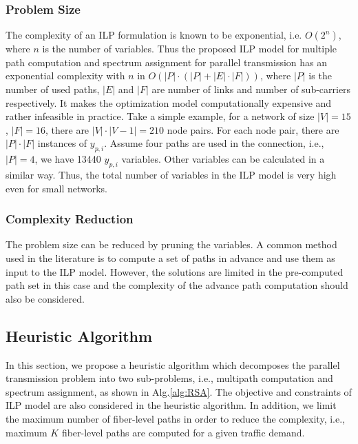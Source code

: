 \documentclass[conference]{IEEEtran}
\begin{document}
\subsubsection{Problem Size}
The complexity of an ILP formulation is known to be exponential, i.e. $O(2^n)$, where $n$ is the number of variables. Thus the
proposed ILP model for  multiple path computation and spectrum assignment for parallel transmission  has an exponential complexity with $n$ in $O(|P|\cdot(|P|+|E|\cdot|F|))$, where $|P|$ is the number of used paths, $|E|$ and $|F|$ are number of links and number of sub-carriers respectively. It 
makes the optimization model computationally  expensive and rather infeasible in practice.  
Take a simple 
example, for a network of size $|V|=15$, $|F|=16$, there are $|V|\cdot |V-1|= 210$ node pairs. For each node pair, there are $|P|\cdot |F|$ instances of $y_{p,i}$.  
Assume  four paths are used in the connection, i.e., $|P|=4$, we have 13440 $y_{p,i}$ variables.  Other variables can be calculated in a similar way. 
Thus, the total number of variables in  the ILP model is very high even for small networks. 
\subsubsection{Complexity Reduction}
The problem size can be reduced by pruning the variables.  A common method used in the literature is to compute a set of paths  in advance and use them as input to the ILP model.
However, the solutions are limited in the pre-computed path set in this case and the  complexity of the advance path computation should also be considered. 


 
\subsection{Heuristic Algorithm} 
 In this section, we propose a heuristic algorithm which decomposes the parallel transmission problem into two sub-problems, i.e.,  multipath computation and spectrum assignment,  as shown in Alg.\ref{alg:RSA}.
 The objective and constraints of  ILP model are also considered in the   heuristic algorithm.  In addition, we limit the maximum number of fiber-level paths in order to reduce the complexity, i.e., maximum $K$ fiber-level paths are computed for a given traffic demand.  
\end{document}
